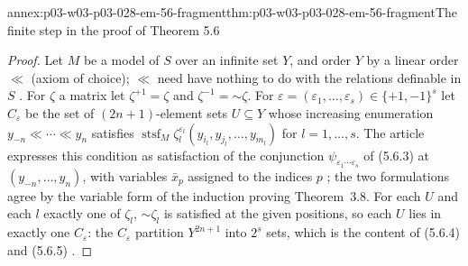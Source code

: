 \begin{annexitem}{annex:p03-w03-p03-028-em-56-fragment}{thm:p03-w03-p03-028-em-56-fragment}{The finite step in the proof of Theorem 5.6}
\begin{proof}
Let \(M\) be a model of \(S\) over an infinite set \(Y\), and order \(Y\) by a
linear order \(\ll\) (axiom of choice); \(\ll\) need have nothing to do with the
relations definable in \(S\) \cite[p.~61]{EhrenfeuchtMostowski1956}.  For
\(\zeta\) a matrix let \(\zeta^{+1}=\zeta\) and
\(\zeta^{-1}=\mathord\sim\zeta\).  For \(\varepsilon=(\varepsilon_1,\ldots,
\varepsilon_s)\in\{+1,-1\}^s\) let \(C_\varepsilon\) be the set of
\((2n+1)\)-element sets \(U\subseteq Y\) whose increasing enumeration
\(y_{-n}\ll\cdots\ll y_n\) satisfies
\(\operatorname{stsf}_M\zeta_l^{\varepsilon_l}(y_{i_l},y_{j_l},\ldots,y_{m_l})\)
for \(l=1,\ldots,s\).  The article expresses this condition as satisfaction of
the conjunction \(\psi_{\varepsilon_1\cdots\varepsilon_s}\) of (5.6.3) at
\((y_{-n},\ldots,y_n)\), with variables \(\bar x_p\) assigned to the indices
\(p\) \cite[(5.6.3), (5.6.6), p.~61]{EhrenfeuchtMostowski1956}; the two
formulations agree by the variable form of the induction proving Theorem~3.8.
For each \(U\) and each \(l\) exactly one of \(\zeta_l\), \(\mathord\sim\zeta_l\)
is satisfied at the given positions, so each \(U\) lies in exactly one
\(C_\varepsilon\): the \(C_\varepsilon\) partition \(Y^{2n+1}\) into \(2^s\) sets,
which is the content of (5.6.4) and (5.6.5)
\cite[pp.~61--62]{EhrenfeuchtMostowski1956}.


\end{proof}
\end{annexitem}
